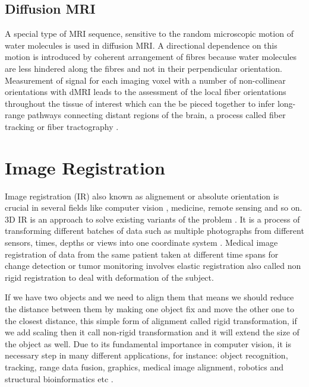 \documentclass[../structure.tex]{subfiles}
\begin{document}
\subsection{Diffusion MRI}
A special type of MRI sequence, sensitive to the random microscopic motion of water molecules is used in diffusion MRI. A directional dependence on this motion is introduced by coherent arrangement of fibres because water molecules are less hindered along the fibres and not in their perpendicular orientation. Measurement of signal for each imaging voxel with a number of non-collinear orientations with dMRI leads to the assessment of the local fiber orientations throughout the tissue of interest which can the be pieced together to infer long-range pathways connecting distant regions of the brain, a process called fiber tracking or fiber tractography \cite{Jeurissen2017}.

\section{Image Registration}
Image registration (IR) also known as alignement or absolute orientation is crucial in several fields like computer vision , medicine, remote sensing and so on. 3D IR is an approach to solve existing variants of the problem \cite{Cordon2006}. It is a process of transforming different batches of data such as multiple photographs from different sensors, times, depths or views into one coordinate system . Medical image registration of data from the same patient taken at different time spans for change detection or tumor monitoring involves elastic registration also called non rigid registration to deal with deformation of the subject.

If we have two objects and we need to align them that means we should reduce the distance between them by making one object fix and move the other one to the closest distance, this simple form of alignment called rigid transformation, if we add scaling then it call non-rigid transformation and it will extend the size of the object as well. Due to its fundamental importance in computer vision, it is necessary step in many different applications, for instance: object recognition, tracking, range data fusion, graphics, medical image alignment, robotics and structural bioinformatics etc \cite{Li2007}.
\end{document}
